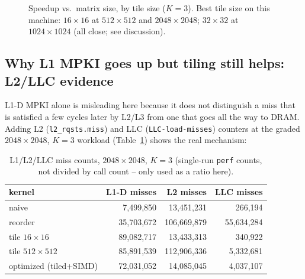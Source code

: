 \documentclass[11pt]{article}
\begin{document}
\begin{figure}[h]
\centering
{}
\caption{Speedup vs.\ matrix size, by tile size ($K{=}3$). Best tile size on this
machine: $16{\times}16$ at $512{\times}512$ and $2048{\times}2048$; $32{\times}32$ at
$1024{\times}1024$ (all close; see discussion).}
\end{figure}

\subsection*{Why L1 MPKI goes up but tiling still helps: L2/LLC evidence}
L1-D MPKI alone is misleading here because it does not distinguish a miss that is
satisfied a few cycles later by L2/L3 from one that goes all the way to DRAM. Adding L2
(\texttt{l2\_rqsts.miss}) and LLC (\texttt{LLC-load-misses}) counters at the graded
$2048{\times}2048$, $K{=}3$ workload (Table~\ref{tab:llc}) shows the real mechanism:

\begin{table}[h]
\centering
\caption{L1/L2/LLC miss counts, $2048{\times}2048$, $K{=}3$ (single-run \texttt{perf}
counts, not divided by call count -- only used as a ratio here).}
\label{tab:llc}
\begin{tabular}{l r r r}
\toprule
kernel & L1-D misses & L2 misses & LLC misses \\
\midrule
naive              & 7{,}499{,}850  & 13{,}451{,}231  & 266{,}194 \\
reorder            & 35{,}703{,}672 & 106{,}669{,}879 & 55{,}634{,}284 \\
tile $16{\times}16$   & 89{,}082{,}717 & 13{,}433{,}313  & 340{,}922 \\
tile $512{\times}512$ & 85{,}891{,}539 & 112{,}906{,}336 & 5{,}332{,}681 \\
optimized (tiled+SIMD)& 72{,}031{,}052 & 14{,}085{,}045  & 4{,}037{,}107 \\
\bottomrule
\end{tabular}
\end{table}
\end{document}
